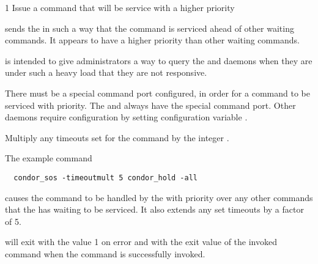 \begin{ManPage}{\label{man-condor-sos}}{1}
{Issue a command that will be service with a higher priority}
\Synopsis {}
\ToolArgsBase



\Description
{} sends the  in such a way 
that the command is serviced ahead of other waiting commands.
It appears to have a higher priority than other waiting commands.

 is intended to give administrators a way to query the
 and  daemons when they are under
such a heavy load that they are not responsive. 

There must be a special command port configured, 
in order for a command to be serviced with priority.
The  and  always have the special
command port.
Other daemons require configuration by setting
configuration variable .

\begin{Options}
  \ToolArgsBaseDesc
    {Multiply any timeouts set for the command by the integer .  }
\end{Options}

\Examples

The example command
\begin{verbatim}
  condor_sos -timeoutmult 5 condor_hold -all
\end{verbatim}
causes the  command to be handled by the
 with priority over any other commands that the 
has waiting to be serviced.
It also extends any set timeouts by a factor of 5.

\ExitStatus

 will exit with the value 1 on error and with the
exit value of the invoked command when the command is successfully
invoked. 

\end{ManPage}
